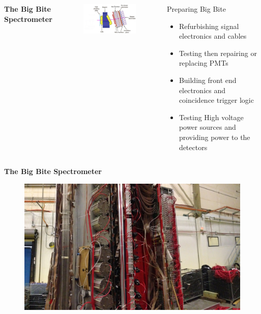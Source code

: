 \documentclass[12pt]{beamer}
\begin{document}
\begin{frame}
\begin{columns}
\hspace*{-0.8cm}
\centering 
\textbf{The Big Bite Spectrometer}

\begin{figure}
\hspace*{-1.2cm}	\includegraphics[width=7cm]{../images/Thesis/BigBite1.png}
\end{figure}
\hspace*{0.5cm}
	\begin{block}{Preparing Big Bite}
		\begin{itemize}
			\item Refurbishing signal electronics and cables
			\item Testing then repairing or replacing PMTs
			\item Building front end electronics and coincidence trigger logic
			\item Testing High voltage power sources and providing power to the detectors
		\end{itemize}
	\end{block}
\end{columns}
\end{frame}

\begin{frame}
\centering 
\textbf{The Big Bite Spectrometer}
\begin{figure}
	\includegraphics[width=12cm]{../images/bbpic.JPG}
\end{figure}
\end{frame}
\end{document}

